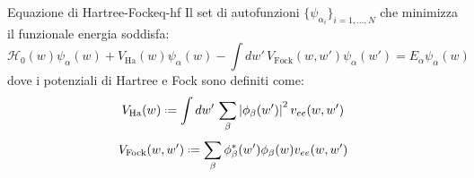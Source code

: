 \begin{theorem}{Equazione di Hartree-Fock}{eq-hf}
	Il set di autofunzioni $ \{\psi_{\alpha_i}\}_{i = 1, \dots, N} $ che minimizza il funzionale energia soddisfa:
	\begin{equation}
		\mathcal{H}_0(w) \psi_\alpha(w) + V_\text{Ha}(w) \psi_\alpha(w) - \int dw'\, V_\text{Fock}(w,w') \psi_\alpha(w') = E_\alpha \psi_\alpha(w)
	\end{equation}
	dove i potenziali di Hartree e Fock sono definiti come:
	\begin{equation}
		V_\text{Ha}(w) \defeq \int dw'\, \sum_\beta \abs{\phi_\beta(w')}^2 v_{ee}(w,w')
	\end{equation}
	\begin{equation}
		V_\text{Fock}(w,w') \defeq \sum_\beta \phi_\beta^*(w') \phi_\beta(w) v_{ee}(w,w')
	\end{equation}

	\tcblower


\end{theorem}
